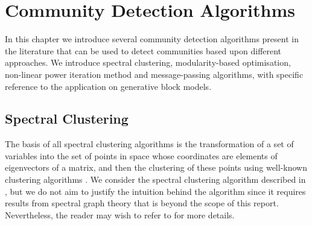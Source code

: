 
\chapter{Community Detection Algorithms}

\label{cha:communityDetectionAlgorithms}


In this chapter we introduce several community detection algorithms present in the literature that can be used to detect communities based upon different approaches.
We introduce spectral clustering, modularity-based optimisation, non-linear power iteration method and message-passing algorithms, with specific reference to the application on generative block models.


\section{Spectral Clustering}
\label{sec:spectralClustering}

The basis of all spectral clustering algorithms is the transformation of a set of variables into the set of points in space whose coordinates are elements of eigenvectors of a matrix, and then the clustering of these points using well-known clustering algorithms \cite{Lux06,For10}.
We consider the spectral clustering algorithm described in \cite{Lux06,For10}, but we do not aim to justify the intuition behind the algorithm since it requires results from spectral graph theory that is beyond the scope of this report.
Nevertheless, the reader may wish to refer to \cite{Lux06,Spi07,For10} for more details.

